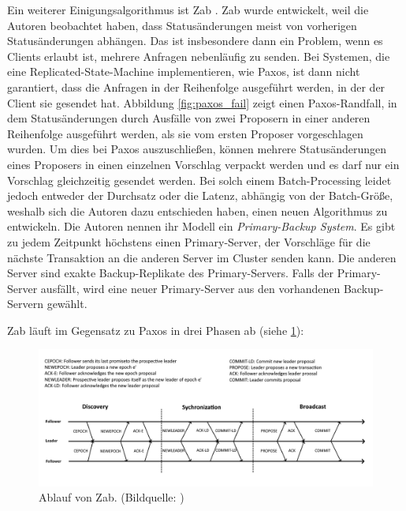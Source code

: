 Ein weiterer Einigungsalgorithmus ist Zab \cite{zab}. Zab wurde entwickelt, weil die Autoren beobachtet haben, dass Statusänderungen meist von vorherigen Statusänderungen abhängen. Das ist insbesondere dann ein Problem, wenn es Clients erlaubt ist, mehrere Anfragen nebenläufig zu senden. Bei Systemen, die eine Replicated-State-Machine implementieren, wie Paxos, ist dann nicht garantiert, dass die Anfragen in der Reihenfolge ausgeführt werden, in der der Client sie gesendet hat. Abbildung \ref{fig:paxos_fail} zeigt einen Paxos-Randfall, in dem Statusänderungen durch Ausfälle von zwei Proposern in einer anderen Reihenfolge ausgeführt werden, als sie vom ersten Proposer vorgeschlagen wurden. Um dies bei Paxos auszuschließen, können mehrere Statusänderungen eines Proposers in einen einzelnen Vorschlag verpackt werden und es darf nur ein Vorschlag gleichzeitig gesendet werden. Bei solch einem Batch-Processing leidet jedoch entweder der Durchsatz oder die Latenz, abhängig von der Batch-Größe, weshalb sich die Autoren dazu entschieden haben, einen neuen Algorithmus zu entwickeln.
Die Autoren nennen ihr Modell ein \textit{Primary-Backup System}. Es gibt zu jedem Zeitpunkt höchstens einen Primary-Server, der Vorschläge für die nächste Transaktion an die anderen Server im Cluster senden kann. Die anderen Server sind exakte Backup-Replikate des Primary-Servers. Falls der Primary-Server ausfällt, wird eine neuer Primary-Server aus den vorhandenen Backup-Servern gewählt.

Zab läuft im Gegensatz zu Paxos in drei Phasen ab (siehe \ref{fig:zab}):

\begin{figure}[t]
	\centering
	\includegraphics[width=\linewidth]{img/zab.png}
	\caption{Ablauf von Zab. (Bildquelle: \cite{zab})}
	\label{fig:zab}
\end{figure}

